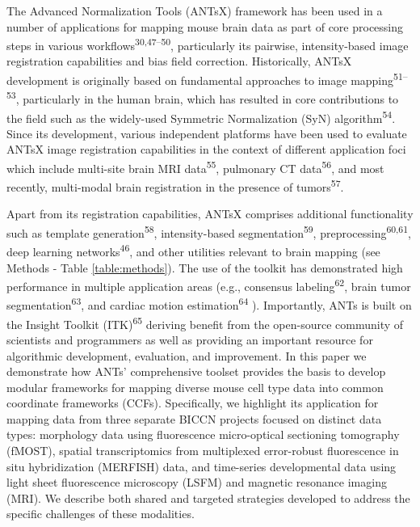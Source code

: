 \documentclass[
  12pt,
]{article}
\begin{document}
The Advanced Normalization Tools (ANTsX) framework has been used in a
number of applications for mapping mouse brain data as part of core
processing steps in various workflows\textsuperscript{30,47--50},
particularly its pairwise, intensity-based image registration
capabilities and bias field correction. Historically, ANTsX development
is originally based on fundamental approaches to image
mapping\textsuperscript{51--53}, particularly in the human brain, which
has resulted in core contributions to the field such as the widely-used
Symmetric Normalization (SyN) algorithm\textsuperscript{54}. Since its
development, various independent platforms have been used to evaluate
ANTsX image registration capabilities in the context of different
application foci which include multi-site brain MRI
data\textsuperscript{55}, pulmonary CT data\textsuperscript{56}, and
most recently, multi-modal brain registration in the presence of
tumors\textsuperscript{57}.

Apart from its registration capabilities, ANTsX comprises additional
functionality such as template generation\textsuperscript{58},
intensity-based segmentation\textsuperscript{59},
preprocessing\textsuperscript{60,61}, deep learning
networks\textsuperscript{46}, and other utilities relevant to brain
mapping (see Methods - Table \ref{table:methods}). The use of the
toolkit has demonstrated high performance in multiple application areas
(e.g., consensus labeling\textsuperscript{62}, brain tumor
segmentation\textsuperscript{63}, and cardiac motion
estimation\textsuperscript{64} ). Importantly, ANTs is built on the
Insight Toolkit (ITK)\textsuperscript{65} deriving benefit from the
open-source community of scientists and programmers as well as providing
an important resource for algorithmic development, evaluation, and
improvement. In this paper we demonstrate how ANTs' comprehensive
toolset provides the basis to develop modular frameworks for mapping
diverse mouse cell type data into common coordinate frameworks (CCFs).
Specifically, we highlight its application for mapping data from three
separate BICCN projects focused on distinct data types: morphology data
using fluorescence micro-optical sectioning tomography (fMOST), spatial
transcriptomics from multiplexed error-robust fluorescence in situ
hybridization (MERFISH) data, and time-series developmental data using
light sheet fluorescence microscopy (LSFM) and magnetic resonance
imaging (MRI). We describe both shared and targeted strategies developed
to address the specific challenges of these modalities.
\end{document}
